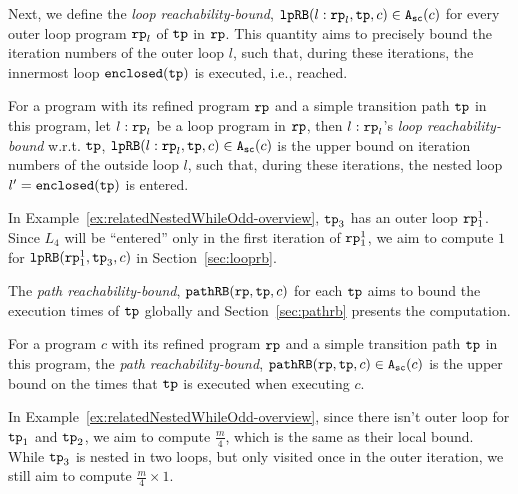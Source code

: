 Next, we define the \emph{loop reachability-bound},
$\mathtt{lpRB}(l: \mathtt{rp}_l, \mathtt{tp}, c) \in {\ensuremath{\mathtt{A_{sc}}}}(c)$ for every outer loop program $\mathtt{rp}_l$ of $\mathtt{tp}$ in $\mathtt{rp}$. This quantity aims to precisely bound the iteration numbers of the outer loop $l$,
such that,
during these iterations, the innermost loop $\mathtt{enclosed(\mathtt{tp})}$ is executed, i.e., reached.
\begin{defn}
For a program with its refined program $\mathtt{rp}$ and a simple transition path $\mathtt{tp}$ in this program, 
let $l: \mathtt{rp}_l$ be a loop program in $\mathtt{rp}$,
then $l: \mathtt{rp}_l$'s \emph{loop reachability-bound} w.r.t. $\mathtt{tp}$,  $\mathtt{lpRB}(l: \mathtt{rp}_l, \mathtt{tp}, c) \in {\ensuremath{\mathtt{A_{sc}}}}(c)$
is the upper bound on iteration numbers of the outside loop $l$,
such that,
during these iterations, the nested loop $l' = \mathtt{enclosed(\mathtt{tp})}$ is entered.
\end{defn}
In Example~\ref{ex:relatedNestedWhileOdd-overview}, $\mathtt{tp}_3$ has an outer loop $\mathtt{rp}_1^1$. Since $L_4$ will be ``entered'' only in the first iteration of $\mathtt{rp}_1^1$,
we aim to compute $1$ for $\mathtt{lpRB}(\mathtt{rp}_1^1, \mathtt{tp}_3, c)$ in Section~\ref{sec:looprb}.

The \emph{path reachability-bound}, $\mathtt{pathRB}(\mathtt{rp}, \mathtt{tp}, c)$ for each $\mathtt{tp}$
aims to bound the execution times of $\mathtt{tp}$ globally
and Section~\ref{sec:pathrb} presents the computation.
%
\begin{defn}
For a program $c$ with its refined program $\mathtt{rp}$ and a simple transition path $\mathtt{tp}$ in this program, 
the \emph{path reachability-bound}, $\mathtt{pathRB}(\mathtt{rp}, \mathtt{tp}, c) \in {\ensuremath{\mathtt{A_{sc}}}}(c)$ is the upper bound on the
times that $\mathtt{tp}$ is executed when executing $c$.
\end{defn}
%
In Example~\ref{ex:relatedNestedWhileOdd-overview}, since there isn't outer loop for $\mathtt{tp}_1$ and $\mathtt{tp}_2$, we aim to compute $\frac{m}{4}$, which is the same as their local bound.
While $\mathtt{tp}_3$ is nested in two loops, but only visited once in the outer iteration, we still aim to compute $\frac{m}{4} \times 1$.

